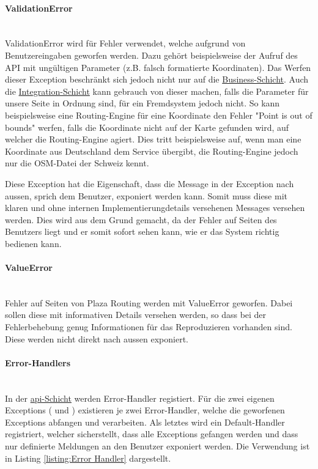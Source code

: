 \paragraph{ValidationError}\label{ehp:PR:ValidationErrorr}~\\
ValidationError wird für Fehler verwendet, welche aufgrund von Benutzereingaben geworfen werden. Dazu gehört beispielsweise der Aufruf des \ac{API} mit ungültigen Parameter (z.B. falsch formatierte Koordinaten). Das Werfen dieser Exception beschränkt sich jedoch nicht nur auf die \hyperref[architektur:business-layer]{Business-Schicht}. Auch die \hyperref[architektur:integration-layer]{Integration-Schicht} kann gebrauch von dieser machen, falls die Parameter für unsere Seite in Ordnung sind, für ein Fremdsystem jedoch nicht. So kann beispielsweise eine \gls{Routing-Engine} für eine Koordinate den Fehler "Point is out of bounds" werfen, falls die Koordinate nicht auf der Karte gefunden wird, auf welcher die Routing-Engine agiert. Dies tritt beispielsweise auf, wenn man eine Koordinate aus Deutschland dem Service übergibt, die Routing-Engine jedoch nur die \ac{OSM}-Datei der Schweiz kennt.

Diese Exception hat die Eigenschaft, dass die Message in der Exception nach aussen, sprich dem Benutzer, exponiert werden kann. Somit muss diese mit klaren und ohne internen Implementierungdetails versehenen Messages versehen werden. Dies wird aus dem Grund gemacht, da der Fehler auf Seiten des Benutzers liegt und er somit sofort sehen kann, wie er das System richtig bedienen kann.

\paragraph{ValueError}\label{ehp:PR:ValueError}~\\
Fehler auf Seiten von Plaza Routing werden mit ValueError geworfen. Dabei sollen diese mit informativen Details versehen werden, so dass bei der Fehlerbehebung genug Informationen für das Reproduzieren vorhanden sind. Diese werden nicht direkt nach aussen exponiert.

\paragraph{Error-Handlers}\label{ehp:Error Handlers}~\\
In der \hyperref[architektur:api-layer]{api-Schicht} werden Error-Handler registiert. Für die zwei eigenen Exceptions ( und ) existieren je zwei Error-Handler, welche die geworfenen Exceptions abfangen und verarbeiten. Als letztes wird ein Default-Handler registriert, welcher sicherstellt, dass alle Exceptions gefangen werden und dass nur definierte Meldungen an den Benutzer exponiert werden. Die Verwendung ist in Listing \ref{listing:Error Handler} dargestellt.

